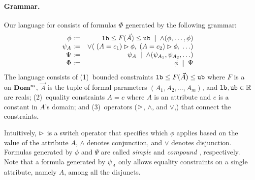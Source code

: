 {
\paragraph{Grammar.} Our language for \dis consists of formulas
$\Phi$ generated by the following grammar:
%
{
\begin{eqnarray*}
    \phi & := & {\mathtt{lb}} \leq F(\vec{A}) \leq {\mathtt{ub}} \; \mid\; \wedge(\phi,\ldots,\phi)
    \\[-0.3em]
    \psi_A & := & \vee(\;(A = c_1) \rhd \phi,\; (A = c_2) \rhd \phi, \;\ldots)
    \\[-0.3em]
    \Psi & := & \psi_A \; \mid \; \wedge(\psi_{A_1}, \psi_{A_2}, \ldots)
	\\[-0.3em]
    \Phi & := & \phi  \;\mid\; \Psi
\end{eqnarray*}
}
%
\noindent 
The language consists of (1)~bounded constraints ${\mathtt{lb}} \leq F(\vec{A})\leq {\mathtt{ub}}$
where $F$ is a \view on $\mathbf{Dom}^m$, $\vec{A}$ is the tuple of formal parameters
$(A_1, A_2, \ldots, A_m)$, and ${\mathtt{lb}}, {\mathtt{ub}} \in {\mathbb{R}}$ are reals; (2)~equality
constraints $A = c$ where $A$ is an attribute and $c$ is a constant in
$A$'s domain; and (3)~operators ($\rhd$, $\wedge$, and $\vee$,) that connect
the constraints.
}
Intuitively, $\rhd$ is a switch operator that specifies which \invariant $\phi$
applies based on the value of the attribute $A$, $\wedge$ denotes conjunction,
and $\vee$ denotes disjunction.
Formulas generated by $\phi$ and $\Psi$ are called {\em{simple \invariants}}
and {\em{compound \invariants}}, respectively. Note that a formula generated by
$\psi_A$ only allows equality constraints on a single attribute, namely $A$,
among all the disjuncts.

